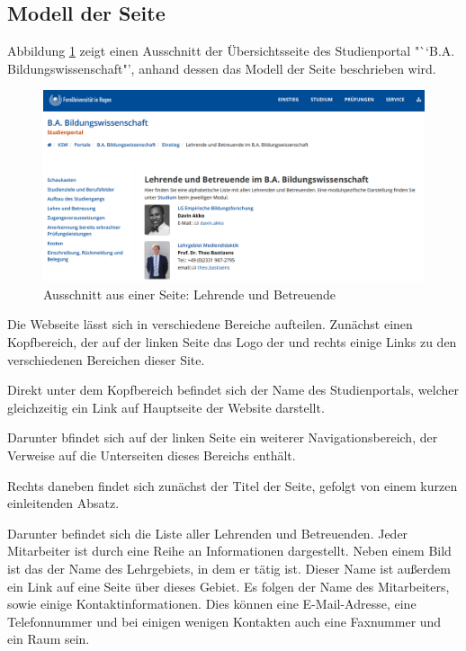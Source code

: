 \subsection{Modell der Seite}
    Abbildung \ref{image:findingTeachersModelOverview} zeigt einen
    Ausschnitt der Übersichtsseite des Studienportal "``B.A. Bildungswissenschaft"',
    anhand dessen das Modell der Seite beschrieben wird.

    \begin{figure}[htb]
        \centering
        \includegraphics[width=\textwidth]{../resources/findings/case-study-1/model/overview.png}
        \caption{Ausschnitt aus einer Seite: Lehrende und Betreuende}
        \label{image:findingTeachersModelOverview}
    \end{figure}

    Die Webseite lässt sich in verschiedene Bereiche aufteilen.
    Zunächst einen Kopfbereich, der auf der linken Seite das Logo
    der {\fernUni} und rechts einige Links zu den verschiedenen
    Bereichen dieser Site.

    Direkt unter dem Kopfbereich befindet sich der Name des Studienportals,
    welcher gleichzeitig ein Link auf Hauptseite der Website darstellt.

    Darunter bfindet sich auf der linken Seite ein weiterer Navigationsbereich,
    der Verweise auf die Unterseiten dieses Bereichs enthält.

    Rechts daneben findet sich zunächst der Titel der Seite,
    gefolgt von einem kurzen einleitenden Absatz.

    Darunter befindet sich die Liste aller Lehrenden und Betreuenden.
    Jeder Mitarbeiter ist durch eine Reihe an Informationen dargestellt.
    Neben einem Bild ist das der Name des Lehrgebiets, in dem er tätig ist.
    Dieser Name ist außerdem ein Link auf eine Seite über dieses Gebiet.
    Es folgen der Name des Mitarbeiters,
    sowie einige Kontaktinformationen.
    Dies können eine E-Mail-Adresse, eine Telefonnummer
    und bei einigen wenigen Kontakten auch eine Faxnummer und ein Raum sein.